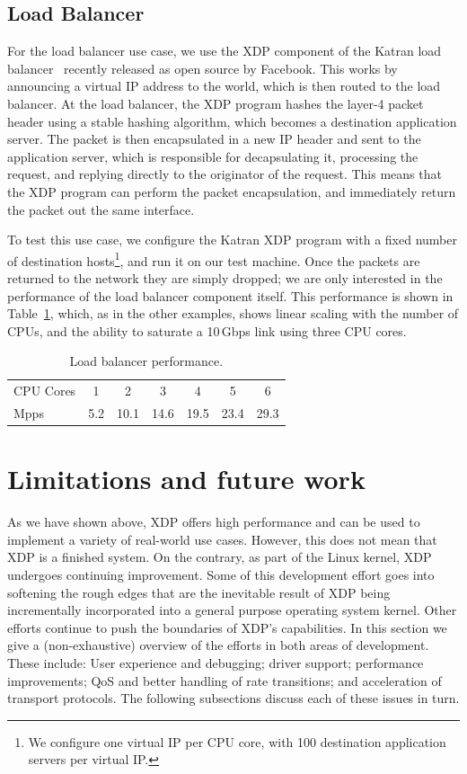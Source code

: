 \documentclass[10pt,sigconf]{acmart}
\begin{document}
\subsection{Load Balancer}
\label{sec:load-balancer}
For the load balancer use case, we use the XDP component of the Katran load
balancer~\cite{katran} recently released as open source by Facebook. This works
by announcing a virtual IP address to the world, which is then routed to the
load balancer. At the load balancer, the XDP program hashes the layer-4 packet
header using a stable hashing algorithm, which becomes a destination application
server. The packet is then encapsulated in a new IP header and sent to the
application server, which is responsible for decapsulating it, processing the
request, and replying directly to the originator of the request. This means that
the XDP program can perform the packet encapsulation, and immediately return the
packet out the same interface.

To test this use case, we configure the Katran XDP program with a fixed number
of destination hosts\footnote{We configure one virtual IP per CPU core, with 100
  destination application servers per virtual IP.}, and run it on our test
machine. Once the packets are returned to the network they are simply dropped;
we are only interested in the performance of the load balancer component itself.
This performance is shown in Table~\ref{tbl:load-balancer}, which, as in the
other examples, shows linear scaling with the number of CPUs, and the ability to
saturate a 10\,Gbps link using three CPU cores.

\begin{table}[htbp]
\caption{\label{tbl:load-balancer}Load balancer performance.}
\centering
\begin{tabular}{lcccccc}
  \toprule
  CPU Cores & 1   &  2  &  3  &  4  &  5  &  6  \\
  Mpps & 5.2 & 10.1 & 14.6 & 19.5 & 23.4 & 29.3 \\
\bottomrule
\end{tabular}
\end{table}


\section{Limitations and future work}
\label{sec:limitations}
As we have shown above, XDP offers high performance and can be used to implement
a variety of real-world use cases. However, this does not mean that XDP is a
finished system. On the contrary, as part of the Linux kernel, XDP undergoes
continuing improvement. Some of this development effort goes into softening the
rough edges that are the inevitable result of XDP being incrementally
incorporated into a general purpose operating system kernel. Other efforts
continue to push the boundaries of XDP's capabilities. In this section we give a
(non-exhaustive) overview of the efforts in both areas of development. These
include: User experience and debugging; driver support; performance
improvements; QoS and better handling of rate transitions; and acceleration of
transport protocols. The following subsections discuss each of these issues in
turn.
\end{document}
